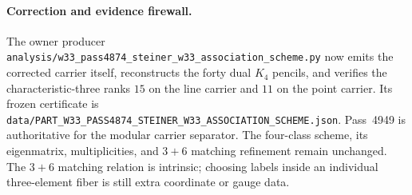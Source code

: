 \paragraph{Correction and evidence firewall.}
The owner producer
\texttt{analysis/w33\_pass4874\_steiner\_w33\_association\_scheme.py}
now emits the corrected carrier itself, reconstructs the forty dual $K_4$
pencils, and verifies the characteristic-three ranks $15$ on the line carrier
and $11$ on the point carrier.  Its frozen certificate is
\texttt{data/PART\_W33\_PASS4874\_STEINER\_W33\_ASSOCIATION\_SCHEME.json}.
Pass~4949 is authoritative for the modular carrier separator.  The four-class
scheme, its eigenmatrix, multiplicities, and $3+6$ matching refinement remain
unchanged.  The $3+6$ matching relation is intrinsic; choosing labels inside
an individual three-element fiber is still extra coordinate or gauge data.
